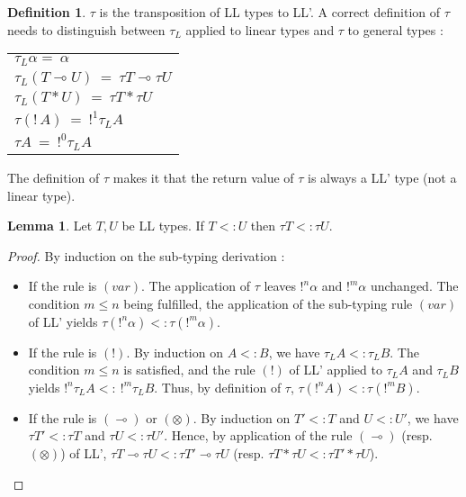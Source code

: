 \documentclass[10pt]{article}
\theoremstyle{plain}
\theoremstyle{definition}
\newtheorem{defn}{Definition}[subsection] %
\newtheorem{lemma}{Lemma}[section]
\def\bang{!\,}
\begin{document}
\begin{defn} $\tau$ is the transposition of LL types to LL'.
	A correct definition of $\tau$ needs to distinguish between $\tau_L$ applied to
	linear types and $\tau$ to general types :
  \begin{center}
	\begin{tabular}{l}
		$\tau_L\alpha = ~ \alpha$ \\
		$\tau_L(T \multimap U) ~ = ~ \tau T \multimap \tau U$ \\
		$\tau_L(T * U) ~=~ \tau T * \tau U$ \\
		$\tau(\bang A) ~ = ~ !^1 \tau_L A$ \\
		$\tau A ~ = ~ !^0 \tau_L A$
	\end{tabular}
	\end{center}
	The definition of $\tau$ makes it that the return value of $\tau$ is always a LL' type (not a linear type).
\end{defn}

\begin{lemma} Let $T, U$ be LL types. If $T <: U$ then $\tau T <: \tau U$.

	\begin{proof}
		By induction on the sub-typing derivation :
		\begin{itemize}
			\item If the rule is $(var)$. The application of $\tau$ leaves $!^n \alpha$ and $!^m \alpha$ unchanged.
				The condition $m \le n$ being fulfilled, the application of the sub-typing rule $(var)$ of LL' yields
				$\tau (!^n \alpha) <: \tau (!^m \alpha)$.
				
			\item If the rule is $(!)$. By induction on $A <: B$, we have $\tau_L A <: \tau_L B$. The condition $m \le n$
				is satisfied, and the rule $(!)$ of LL' applied to $\tau_L A$ and $\tau_L B$ yields $!^n \tau_L A <: ~ !^m \tau_L B$.
				Thus, by definition of $\tau$, $\tau (!^n A) <: \tau (!^m B)$.

			\item If the rule is $(\multimap)$ or $(\otimes)$. By induction on $T' <: T$ and $U <: U'$, we have $\tau T' <: \tau T$ and
				$\tau U <: \tau U'$. Hence, by application of the rule $(\multimap)$ (resp. $(\otimes)$) of LL',
				$\tau T \multimap \tau U <: \tau T' \multimap \tau U$ (resp. $\tau T * \tau U <: \tau T' * \tau U$).
				
		\end{itemize}
	\end{proof}
\end{lemma}
	
\end{document}
